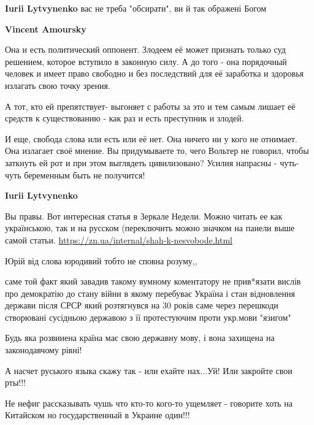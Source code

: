 \begin{itemize}
\begin{itemize}

\textbf{Iurii Lytvynenko} вас не треба "обсирати", ви й так ображені Богом


\textbf{Vincent Amoursky} 

Она и есть политический оппонент. Злодеем её может признать только суд
решением, которое вступило в законную силу. А до того - она порядочный человек
и имеет право свободно и без последствий для её заработка и здоровья излагать
свою точку зрения. 

А тот, кто ей препятствует- выгоняет с работы за это и тем самым лишает её
средств к существованию - как раз и есть преступник и злодей. 

И еще, свобода слова или есть или её нет. Она ничего ни у кого не отнимает. Она
излагает своё мнение. Вы придумываете то, чего Вольтер не говорил, чтобы
заткнуть ей рот и при этом выглядеть цивилизовано? Усилия напрасны - чуть-чуть
беременным быть не получится!


\textbf{Iurii Lytvynenko} 

Вы правы. Вот интересная статья в Зеркале Недели. Можно читать ее как
українською, так и на русском (переключить можно значком на панели выше самой
статьи. \url{https://zn.ua/internal/shah-k-nesvobode.html}



Юрій від слова юродивий тобто не сповна розуму,,

саме той факт який завадив такому вумному коментатору не прив*язати вислів про
демократію до стану війни в якому перебуває Україна і стан відновлення держави
після СРСР який розтягнувся на 30 років саме через перешкоди створювані
сусідньою державою з її протестуючим проти укр.мови "язигом"

\end{itemize}


Будь яка розвинена країна має свою державну мову, і вона захищена на
законодавчому рівні!

А насчет руського языка скажу так - или ехайте нах...Уй! Или закройте свои
рты!!!

Не нефиг рассказывать чушь что кто-то кого-то ущемляет - говорите хоть на
Китайском но государственный в Украине один!!!

\end{itemize}

